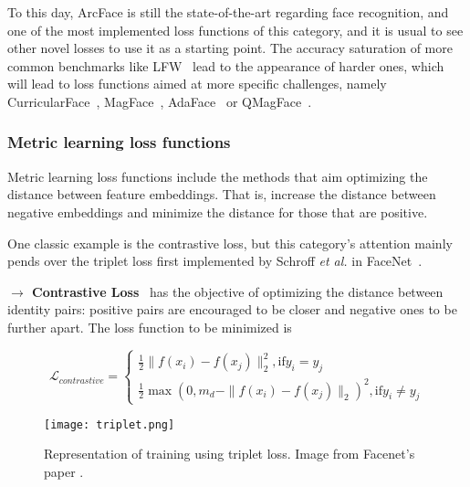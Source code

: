 \documentclass[class=report, crop=false, a4paper, 12pt]{standalone}
\begin{document}
\par To this day, ArcFace is still the state-of-the-art regarding face recognition, and one of the most implemented loss functions of this category, and it is usual to see other novel losses to use it as a starting point. The accuracy saturation of more common benchmarks like LFW~\autocite{huangLabeledFacesWild} lead to the appearance of harder ones, which will lead to loss functions aimed at more specific challenges, namely CurricularFace~\autocite{huangCurricularFaceAdaptiveCurriculum2020}, MagFace~\autocite{mengMagFaceUniversalRepresentation2021}, AdaFace~\autocite{kimAdaFaceQualityAdaptive2022} or QMagFace~\autocite{terhorstQMagFaceSimpleAccurate2023}.

\subsubsection{Metric learning loss functions}
Metric learning loss functions include the methods that aim optimizing the distance between feature embeddings. That is, increase the distance between negative embeddings and minimize the distance for those that are positive.
\par One classic example is the contrastive loss, but this category's attention mainly pends over the triplet loss first implemented by Schroff \textit{et al.} in FaceNet~\autocite{schroffFaceNetUnifiedEmbedding2015}. 

\vspace{0.7\baselineskip}
\noindent\textbf{$\rightarrow$ Contrastive Loss}~\autocite{duElementsEndtoendDeep2022} has the objective of optimizing the distance between identity pairs: positive pairs are encouraged to be closer and negative ones to be further apart. The loss function to be minimized is

\begin{equation}
    \mathcal{L}_{contrastive} = 
    \begin{cases}
      \frac{1}{2}\|f(x_i)-f(x_j)\|^{2}_{2}, \text{if} y_i=y_j\\
      \frac{1}{2}\max{(0, m_d-\|f(x_i)-f(x_j)\|_2)^2}, \text{if} y_i\neq y_j
    \end{cases}
\end{equation}

\begin{figure}[!h]
    \centering
    \texttt{[image: triplet.png]}
    \caption{Representation of training using triplet loss. Image from Facenet's paper \autocite{schroffFaceNetUnifiedEmbedding2015}.}
    \label{fig:triplet}
\end{figure}
\end{document}
